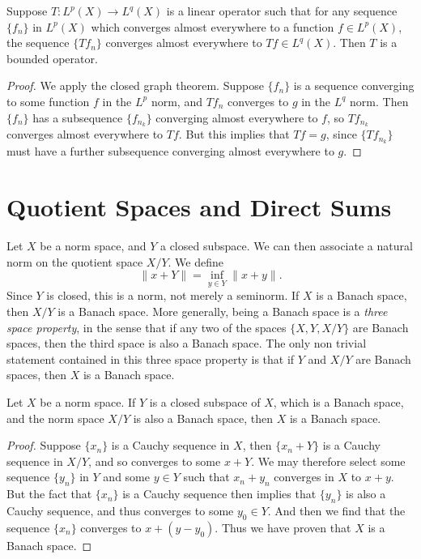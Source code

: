 \begin{theorem}
    Suppose $T: L^p(X) \to L^q(X)$ is a linear operator such that for any sequence $\{ f_n \}$ in $L^p(X)$ which converges almost everywhere to a function $f \in L^p(X)$, the sequence $\{ Tf_n \}$ converges almost everywhere to $Tf \in L^q(X)$. Then $T$ is a bounded operator.
\end{theorem}
\begin{proof}
    We apply the closed graph theorem. Suppose $\{ f_n \}$ is a sequence converging to some function $f$ in the $L^p$ norm, and $Tf_n$ converges to $g$ in the $L^q$ norm. Then $\{ f_n \}$ has a subsequence $\{ f_{n_k} \}$ converging almost everywhere to $f$, so $Tf_{n_k}$ converges almost everywhere to $Tf$. But this implies that $Tf = g$, since $\{ Tf_{n_k} \}$ must have a further subsequence converging almost everywhere to $g$.
\end{proof}

\section{Quotient Spaces and Direct Sums}

Let $X$ be a norm space, and $Y$ a closed subspace. We can then associate a natural norm on the quotient space $X/Y$. We define
%
\[ \| x + Y \| = \inf_{y \in Y} \| x + y \|. \]
%
Since $Y$ is closed, this is a norm, not merely a seminorm. If $X$ is a Banach space, then $X/Y$ is a Banach space. More generally, being a Banach space is a {\it three space property}, in the sense that if any two of the spaces $\{ X, Y, X/Y \}$ are Banach spaces, then the third space is also a Banach space. The only non trivial statement contained in this three space property is that if $Y$ and $X/Y$ are Banach spaces, then $X$ is a Banach space.

\begin{lemma}
    Let $X$ be a norm space. If $Y$ is a closed subspace of $X$, which is a Banach space, and the norm space $X/Y$ is also a Banach space, then $X$ is a Banach space.
\end{lemma}
\begin{proof}
    Suppose $\{ x_n \}$ is a Cauchy sequence in $X$, then $\{ x_n + Y \}$ is a Cauchy sequence in $X/Y$, and so converges to some $x + Y$. We may therefore select some sequence $\{ y_n \}$ in $Y$ and some $y \in Y$ such that $x_n + y_n$ converges in $X$ to $x + y$. But the fact that $\{ x_n \}$ is a Cauchy sequence then implies that $\{ y_n \}$ is also a Cauchy sequence, and thus converges to some $y_0 \in Y$. And then we find that the sequence $\{ x_n \}$ converges to $x + (y - y_0)$. Thus we have proven that $X$ is a Banach space.
\end{proof}

